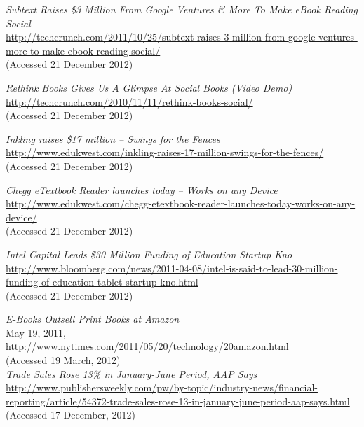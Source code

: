 \documentclass[a4paper,10pt]{article}
\begin{document}
\begin{thebibliography}{9}
 \emph{Subtext Raises \$3 Million From Google Ventures \& More To Make eBook Reading Social}\\
 \url{http://techcrunch.com/2011/10/25/subtext-raises-3-million-from-google-ventures-more-to-make-ebook-reading-social/}\\
   (Accessed 21 December 2012)
 
  \emph{Rethink Books Gives Us A Glimpse At Social Books (Video Demo)}\\
  \url{http://techcrunch.com/2010/11/11/rethink-books-social/}\\
  (Accessed 21 December 2012)
  
   \emph{Inkling raises \$17 million – Swings for the Fences}\\
   \url{http://www.edukwest.com/inkling-raises-17-million-swings-for-the-fences/}\\
 (Accessed 21 December 2012)
 
   \emph{Chegg eTextbook Reader launches today – Works on any Device}\\
   \url{http://www.edukwest.com/chegg-etextbook-reader-launches-today-works-on-any-device/}\\
 (Accessed 21 December 2012)
 
   \emph{Intel Capital Leads \$30 Million Funding of Education Startup Kno}\\
   \url{http://www.bloomberg.com/news/2011-04-08/intel-is-said-to-lead-30-million-funding-of-education-tablet-startup-kno.html}\\
  (Accessed 21 December 2012)
   
  \emph{E-Books Outsell Print Books at Amazon}\\ 
  May 19, 2011,\\
  \url{http://www.nytimes.com/2011/05/20/technology/20amazon.html}\\
  (Accessed 19 March, 2012)\\

   \emph{Trade Sales Rose 13\% in January-June Period, AAP Says } \\
  \url{http://www.publishersweekly.com/pw/by-topic/industry-news/financial-reporting/article/54372-trade-sales-rose-13-in-january-june-period-aap-says.html}\\
  (Accessed 17 December, 2012)\\
  

\end{thebibliography}
\end{document}
